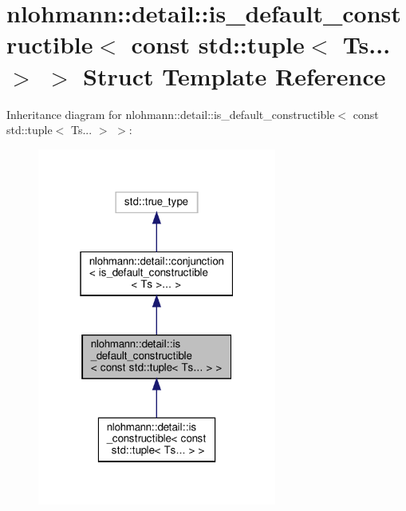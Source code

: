 \hypertarget{structnlohmann_1_1detail_1_1is__default__constructible_3_01const_01std_1_1tuple_3_01Ts_8_8_8_01_4_01_4}{}\section{nlohmann\+:\+:detail\+:\+:is\+\_\+default\+\_\+constructible$<$ const std\+:\+:tuple$<$ Ts... $>$ $>$ Struct Template Reference}
\label{structnlohmann_1_1detail_1_1is__default__constructible_3_01const_01std_1_1tuple_3_01Ts_8_8_8_01_4_01_4}


Inheritance diagram for nlohmann\+:\+:detail\+:\+:is\+\_\+default\+\_\+constructible$<$ const std\+:\+:tuple$<$ Ts... $>$ $>$\+:
\nopagebreak
\begin{figure}[H]
\begin{center}
\leavevmode
\includegraphics[width=223pt]{structnlohmann_1_1detail_1_1is__default__constructible_3_01const_01std_1_1tuple_3_01Ts_8_8_8_01_4_01_4__inherit__graph}
\end{center}
\end{figure}


